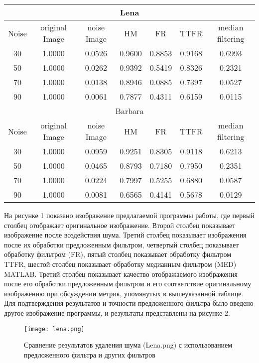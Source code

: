 \begin{table}[H]
    \centering
    \begin{tabular}{ccccccc}
        \hline
        \multicolumn{7}{c}{Lena} \\
        \hline
        Noise & original Image & noise Image & HM & FR & TTFR & median filtering \\
        30 & 1.0000 & 0.0526 & 0.9600 & 0.8853 & 0.9168 & 0.6993 \\
        50 & 1.0000 & 0.0262 & 0.9392 & 0.5419 & 0.8326 & 0.2321 \\
        70 & 1.0000 & 0.0138 & 0.8946 & 0.0885 & 0.7397 & 0.0527 \\
        90 & 1.0000 & 0.0061 & 0.7877 & 0.4311 & 0.6159 & 0.0115 \\
        \multicolumn{7}{c}{Barbara} \\
        Noise & original Image & noise Image & HM & FR & TTFR & median filtering \\
        30 & 1.0000 & 0.0959 & 0.9251 & 0.8305 & 0.9118 & 0.6213 \\
        50 & 1.0000 & 0.0465 & 0.8793 & 0.7180 & 0.7950 & 0.2351 \\
        70 & 1.0000 & 0.0224 & 0.7997 & 0.5255 & 0.6880 & 0.0587 \\
        90 & 1.0000 & 0.0081 & 0.6565 & 0.4141 & 0.5678 & 0.0129 \\
        \hline
    \end{tabular}
    \caption{}
\end{table}

На рисунке 1 показано изображение предлагаемой программы работы, где первый
столбец отображает оригинальное изображение. Второй столбец показывает
изображение после воздействия шума. Третий столбец показывает изображения после
их обработки предложенным фильтром, четвертый столбец показывает обработку
фильтром (FR), пятый столбец показывает обработку фильтром TTFR, шестой столбец
показывает обработку медианным фильтром (MED) MATLAB. Третий столбец показывает
качество отображаемого изображения после его обработки предложенным фильтром и
его соответствие оригинальному изображению при обсуждении метрик, упомянутых в
вышеуказанной таблице. Для подтверждения результатов и точности предложенного
фильтра было введено другое изображение программы, и результаты представлены на
рисунке 2.

\begin{figure}[H]
    \centering
    \texttt{[image: lena.png]}
    \caption{Сравнение результатов удаления шума (Lena.png) 
    с использованием предложенного фильтра и других фильтров}
\end{figure}

